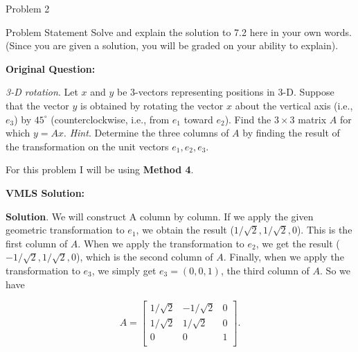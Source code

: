 \begin{problem}{Problem 2}
    \begin{statement}{Problem Statement}
        Solve and explain the solution to 7.2  here in your own words. (Since you are given a solution, you will be graded on your ability to explain). \vspace*{1em}

        \noindent \textbf{Original Question:} \vspace*{1em}

        \textit{3-D rotation}. Let $x$ and $y$ be 3-vectors representing positions in 3-D. Suppose that the vector $y$ is obtained by rotating the vector $x$ about the vertical axis (i.e., $e_{3}$) 
        by $45^{\circ}$ (counterclockwise, i.e., from $e_{1}$ toward $e_{2}$). Find the $3 \times 3$ matrix $A$ for which $y = Ax$. \textit{Hint}. Determine the three columns of $A$ by finding the 
        result of the transformation on the unit vectors $e_{1}, e_{2}, e_{3}$.
    \end{statement}

    \begin{highlight}[Solution]
        For this problem I will be using \textbf{Method 4}. \vspace*{1em}

        \noindent \textbf{VMLS Solution:} \vspace*{1em}
        
        \textbf{Solution}. We will construct A column by column. If we apply the given geometric transformation to $e_{1}$, we obtain the result ($1 / \sqrt{2}, 1 / \sqrt{2}, 0$). This is the first column of 
        $A$. When we apply the transformation to $e_{2}$, we get the result ($-1 / \sqrt{2}, 1 / \sqrt{2}, 0$), which is the second column of $A$. Finally, when we apply the transformation to $e_{3}$, 
        we simply get $e_{3} = (0,0,1)$, the third column of $A$. So we have

        \begin{equation*}
            A = 
            \begin{bmatrix}
                1 / \sqrt{2} & -1 / \sqrt{2} & 0 \\
                1 / \sqrt{2} & 1 / \sqrt{2} & 0 \\
                0 & 0 & 1 \\
            \end{bmatrix}.
        \end{equation*}


\end{highlight}
\end{problem}
